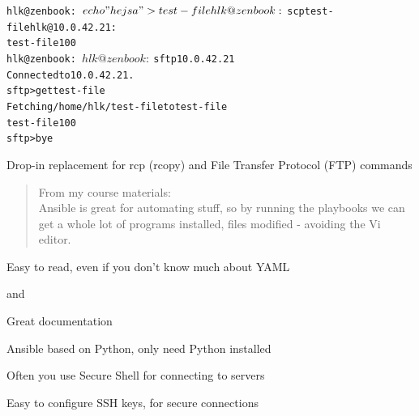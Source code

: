 \documentclass[Screen16to9,17pt]{foils}
\begin{document}
\begin{alltt}\small
hlk@zenbook:~$ echo "hejsa" > test-file
hlk@zenbook:~$ scp test-file hlk@10.0.42.21:
test-file                                                         100%
hlk@zenbook:~$

hlk@zenbook:~$ sftp 10.0.42.21
Connected to 10.0.42.21.
sftp> get test-file
Fetching /home/hlk/test-file to test-file
test-file                                                         100%
sftp> bye
\end{alltt}

Drop-in replacement for rcp (rcopy) and File Transfer Protocol (FTP) commands



\begin{quote}
From my course materials:\\
Ansible is great for automating stuff, so by running the playbooks we can get a whole lot of programs installed, files modified - avoiding the Vi editor.
\end{quote}

\begin{list2}
\item Easy to read, even if you don't know much about YAML
\item {} and 
\item Great documentation\\
\end{list2}




\begin{list2}
\item Ansible based on Python, only need Python installed\\
\item Often you use Secure Shell for connecting to servers\\
\item Easy to configure SSH keys, for secure connections
\end{list2}


\end{document}
